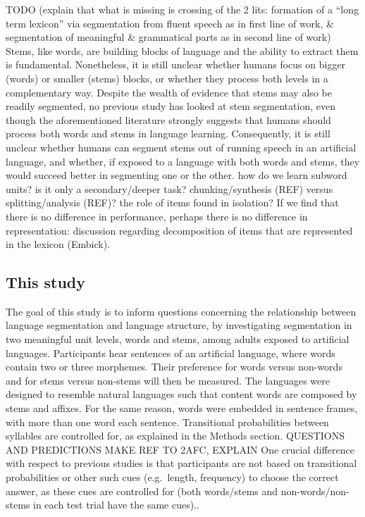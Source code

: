 \documentclass[
  american,
  ,man,floatsintext]{apa6}
\begin{document}
TODO (explain that what is missing is crossing of the 2 lits: formation of a ``long term lexicon'' via segmentation from fluent speech as in first line of work, \& segmentation of meaningful \& grammatical parts as in second line of work) Stems, like words, are building blocks of language and the ability to extract them is fundamental. Nonetheless, it is still unclear whether humans focus on bigger (words) or smaller (stems) blocks, or whether they process both levels in a complementary way. Despite the wealth of evidence that stems may also be readily segmented, no previous study has looked at stem segmentation, even though the aforementioned literature strongly suggests that humans should process both words and stems in language learning. Consequently, it is still unclear whether humans can segment stems out of running speech in an artificial language, and whether, if exposed to a language with both words and stems, they would succeed better in segmenting one or the other.
how do we learn subword units? is it only a secondary/deeper task? chunking/synthesis (REF) versus splitting/analysis (REF)? the role of items found in isolation? If we find that there is no difference in performance, perhaps there is no difference in representation: discussion regarding decomposition of items that are represented in the lexicon (Embick).

\hypertarget{this-study}{%
\subsection{This study}\label{this-study}}

The goal of this study is to inform questions concerning the relationship between language segmentation and language structure, by investigating segmentation in two meaningful unit levels, words and stems, among adults exposed to artificial languages. Participants hear sentences of an artificial language, where words contain two or three morphemes. Their preference for words versus non-words and for stems versus non-stems will then be measured. The languages were designed to resemble natural languages such that content words are composed by stems and affixes. For the same reason, words were embedded in sentence frames, with more than one word each sentence. Transitional probabilities between syllables are controlled for, as explained in the Methods section. QUESTIONS AND PREDICTIONS MAKE REF TO 2AFC, EXPLAIN One crucial difference with respect to previous studies is that participants are not based on transitional probabilities or other such cues (e.g.~length, frequency) to choose the correct answer, as these cues are controlled for (both words/stems and non-words/non-stems in each test trial have the same cues)..
\end{document}
